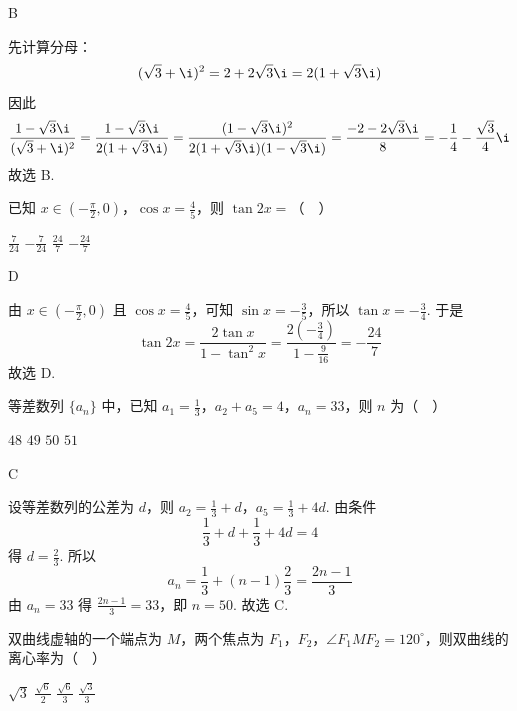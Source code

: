 \begin{answer}
B
\end{answer}

\begin{solution}
先计算分母：
\[
(\sqrt{3}+\i)^2=2+2\sqrt{3}\i=2(1+\sqrt{3}\i)
\]
因此
\[
\frac{1-\sqrt{3}\i}{(\sqrt{3}+\i)^2}
=\frac{1-\sqrt{3}\i}{2(1+\sqrt{3}\i)}
=\frac{(1-\sqrt{3}\i)^2}{2(1+\sqrt{3}\i)(1-\sqrt{3}\i)}
=\frac{-2-2\sqrt{3}\i}{8}
=-\frac14-\frac{\sqrt{3}}4\i
\]
故选 B.
\end{solution}

\begin{problem}
已知 \(x \in \left(-\frac{\pi}{2},0\right)\)，\(\cos x = \frac{4}{5}\)，则 \(\tan 2x =\)（\(\quad\)）

\choices
    {\(\frac{7}{24}\)}
    {\(-\frac{7}{24}\)}
    {\(\frac{24}{7}\)}
    {\(-\frac{24}{7}\)}
\end{problem}

\begin{answer}
D
\end{answer}

\begin{solution}
由 \(x\in\left(-\frac{\pi}{2},0\right)\) 且 \(\cos x=\frac45\)，可知 \(\sin x=-\frac35\)，所以 \(\tan x=-\frac34\). 于是
\[
\tan 2x=\frac{2\tan x}{1-\tan^2x}=\frac{2\left(-\frac34\right)}{1-\frac{9}{16}}=-\frac{24}{7}
\]
故选 D.
\end{solution}

\begin{problem}
等差数列 \(\{a_{n}\}\) 中，已知 \(a_1 = \frac{1}{3}\)，\(a_2 + a_5 = 4\)，\(a_n = 33\)，则 \(n\) 为（\(\quad\)）

\choices
    {\(48\)}
    {\(49\)}
    {\(50\)}
    {\(51\)}
\end{problem}

\begin{answer}
C
\end{answer}

\begin{solution}
设等差数列的公差为 \(d\)，则 \(a_2=\frac13+d\)，\(a_5=\frac13+4d\). 由条件
\[
\frac13+d+\frac13+4d=4
\]
得 \(d=\frac23\). 所以
\[
a_n=\frac13+(n-1)\frac23=\frac{2n-1}{3}
\]
由 \(a_n=33\) 得 \(\frac{2n-1}{3}=33\)，即 \(n=50\). 故选 C.
\end{solution}

\begin{problem}
双曲线虚轴的一个端点为 \(M\)，两个焦点为 \(F_{1}\)，\(F_{2}\)，\(\angle F_{1}MF_{2} = 120^{\circ}\)，则双曲线的离心率为（\(\quad\)）

\choices
    {\(\sqrt{3}\)}
    {\(\frac{\sqrt{6}}{2}\)}
    {\(\frac{\sqrt{6}}{3}\)}
    {\(\frac{\sqrt{3}}{3}\)}
\end{problem}

